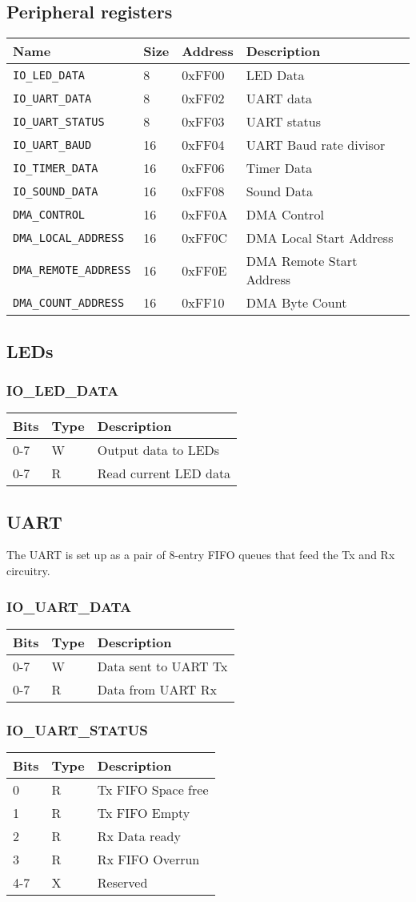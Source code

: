 \documentclass{article}
\newcommand{\regdesc}[2]{
  \subsubsection{#1}
  \begin{tabular}{|l|l|l|}
    \hline
    Bits & Type & Description \\ \hline
    #2
  \end{tabular}
}
\begin{document}
        \subsection{Peripheral registers}
                \begin{tabular}{|l|l|l|l|}
        \hline
        Name & Size & Address & Description \\ \hline
        \verb|IO_LED_DATA| & 8 &0xFF00 & LED Data \\ \hline
        \verb|IO_UART_DATA| & 8 &0xFF02 & UART data \\ \hline
        \verb|IO_UART_STATUS| & 8 & 0xFF03 & UART status \\ \hline
        \verb|IO_UART_BAUD| & 16 & 0xFF04 & UART Baud rate divisor \\ \hline
        \verb|IO_TIMER_DATA| & 16 & 0xFF06 & Timer Data \\ \hline
        \verb|IO_SOUND_DATA| & 16 & 0xFF08 & Sound Data \\ \hline
        \verb|DMA_CONTROL| & 16 & 0xFF0A & DMA Control \\ \hline
        \verb|DMA_LOCAL_ADDRESS| & 16 & 0xFF0C & DMA Local Start Address \\ \hline
        \verb|DMA_REMOTE_ADDRESS| & 16 & 0xFF0E & DMA Remote Start Address \\ \hline
        \verb|DMA_COUNT_ADDRESS| & 16 & 0xFF10 & DMA Byte Count \\ \hline
        
        \end{tabular}


        \subsection{LEDs}
        \regdesc{IO\_LED\_DATA}{
          0-7 & W & Output data to LEDs \\ \hline
          0-7 & R & Read current LED data \\ \hline
        }
        \subsection{UART}
        The UART is set up as a pair of 8-entry FIFO queues that feed the Tx and Rx circuitry. \\

        \regdesc{IO\_UART\_DATA}{
        0-7 & W & Data sent to UART Tx \\ \hline
        0-7 & R & Data from UART Rx \\ \hline
        }
        \regdesc{IO\_UART\_STATUS}{
        0 & R & Tx FIFO Space free \\ \hline
        1 & R & Tx FIFO Empty \\ \hline
        2 & R & Rx Data ready \\ \hline
        3 & R & Rx FIFO Overrun \\ \hline
        4-7 & X & Reserved \\ \hline
        }
\end{document}
